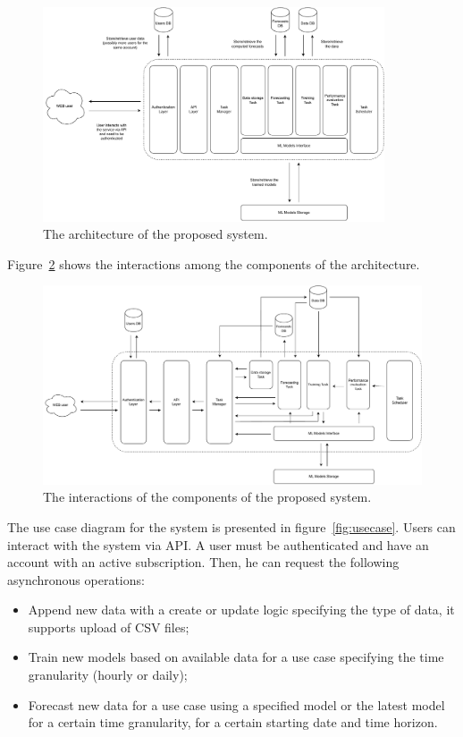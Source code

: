 \begin{figure}[H]
\centering 
\includegraphics[width=0.9\textwidth]{images/architecture_components}
\caption{The architecture of the proposed system.}
\label{fig:components}
\end{figure}

Figure~\ref{fig:interactions} shows the interactions among the components of the architecture.

\begin{figure}[H]
\centering 
\includegraphics[width=1\textwidth]{images/architecture_interactions}
\caption{The interactions of the components of the proposed system.}
\label{fig:interactions}
\end{figure}

The use case diagram for the system is presented in figure~\ref{fig:usecase}.
Users can interact with the system via API.
A user must be authenticated and have an account with an active subscription.
Then, he can request the following asynchronous operations:
\begin{itemize}
  \item Append new data with a create or update logic specifying the type of data, it supports upload of CSV files;
  \item Train new models based on available data for a use case specifying the time granularity (hourly or daily);
  \item Forecast new data for a use case using a specified model or the latest model for a certain time granularity, for a certain starting date and time horizon.
\end{itemize}

